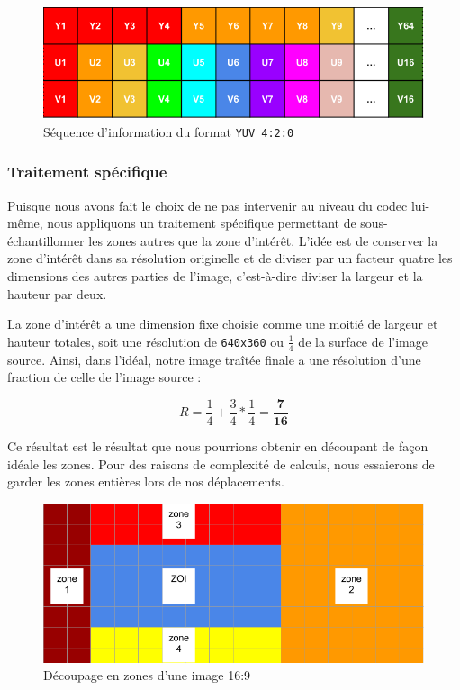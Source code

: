 \documentclass[11pt,a4paper]{article}
\begin{document}
\begin{figure}[H]
\begin{center}
\includegraphics[scale=0.5]{images/yuv2.png}
\end{center}
\caption{Séquence d'information du format \texttt{YUV 4:2:0}}
\label{}
\end{figure}

\bigbreak

\subsubsection{Traitement spécifique}
Puisque nous avons fait le choix de ne pas intervenir au niveau du codec lui-même, nous appliquons un traitement spécifique permettant de sous-échantillonner les zones autres que la zone d'intérêt.
L'idée est de conserver la zone d'intérêt dans sa résolution originelle et de diviser par un facteur quatre les dimensions des autres parties de l'image, c'est-à-dire diviser la largeur et la hauteur par deux.

\bigbreak
La zone d'intérêt a une dimension fixe choisie comme une moitié de largeur et hauteur totales, soit une résolution de \texttt{640x360} ou $\frac{1}{4}$ de la surface de l'image source.
Ainsi, dans l'idéal, notre image traîtée finale a une résolution d'une fraction de celle de l'image source :

$$ R = \frac{1}{4} + \frac{3}{4}*\frac{1}{4} = \mathbf{\frac{7}{16}} $$

Ce résultat est le résultat que nous pourrions obtenir en découpant de façon idéale les zones.
Pour des raisons de complexité de calculs, nous essaierons de garder les zones entières lors de nos déplacements.

\begin{figure}[H]
\begin{center}
\includegraphics[scale=0.4]{images/decoupage.png}
\end{center}
\caption{Découpage en zones d'une image 16:9}
\label{}
\end{figure}
\end{document}
